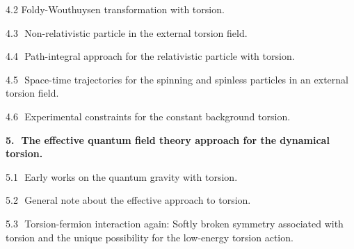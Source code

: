 \vskip 1mm \noindent
{4.2$\,\,$Foldy-Wouthuysen transformation with torsion.}

\vskip 1mm \noindent
{4.3 
$\,\,$Non-relativistic particle in the external torsion field.}

\vskip 1mm \noindent
{4.4 $\,\,$Path-integral approach for the relativistic particle
   with torsion.}

\vskip 1mm \noindent
{4.5 $\,\,$Space-time trajectories for the spinning and spinless
  particles in an external torsion field.}

\vskip 1mm \noindent
{4.6 $\,\,$Experimental constraints for the constant background
torsion.}

\vskip 3mm {\large\bf 5.$\,\,$
The effective quantum field theory approach for the 
dynamical torsion.}


\vskip 1mm \noindent
{5.1 $\,\,$Early works on the quantum gravity with torsion.}

\vskip 1mm \noindent
{5.2 $\,\,$General note about the effective approach to torsion.}

\vskip 1mm \noindent
{5.3 $\,\,$Torsion-fermion interaction again:
Softly broken symmetry associated with torsion and
the unique possibility for the low-energy torsion action.}

